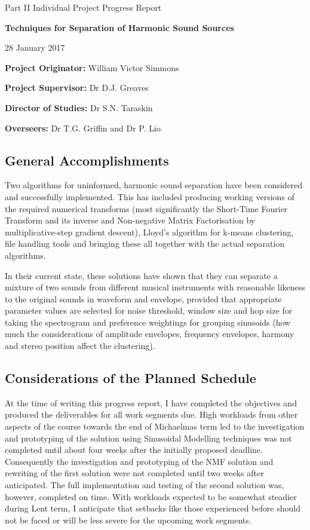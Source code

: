 \documentclass[12pt]{article}
\begin{document}
\medskip
{}
\medskip
{}

\vspace{5mm}

\centerline{\large Part II Individual Project Progress Report}
\vspace{5mm}
\centerline{\Large\bf Techniques for Separation of Harmonic Sound Sources}
\vspace{5mm}
\centerline{\large 28 January 2017}

{\bf Project Originator:} William Victor Simmons

{\bf Project Supervisor:} Dr D.J. Greaves

{\bf Director of Studies:} Dr S.N. Taraskin

{\bf Overseers:} Dr T.G. Griffin and Dr P. Lio

\subsection*{General Accomplishments}

Two algorithms for uninformed, harmonic sound separation have been considered and successfully implemented. This has included producing working versions of the required numerical transforms (most significantly the Short-Time Fourier Transform and its inverse and Non-negative Matrix Factorisation by multiplicative-step gradient descent), Lloyd's algorithm for k-means clustering, file handling tools and bringing these all together with the actual separation algorithms.

In their current state, these solutions have shown that they can separate a mixture of two sounds from different musical instruments with reasonable likeness to the original sounds in waveform and envelope, provided that appropriate parameter values are selected for noise threshold, window size and hop size for taking the spectrogram and preference weightings for grouping sinusoids (how much the considerations of amplitude envelopes, frequency envelopes, harmony and stereo position affect the clustering).

\subsection*{Considerations of the Planned Schedule}

At the time of writing this progress report, I have completed the objectives and produced the deliverables for all work segments due. High workloads from other aspects of the course towards the end of Michaelmas term led to the investigation and prototyping of the solution using Sinusoidal Modelling techniques was not completed until about four weeks after the initially proposed deadline. Consequently the investigation and prototyping of the NMF solution and rewriting of the first solution were not completed until two weeks after anticipated. The full implementation and testing of the second solution was, however, completed on time. With workloads expected to be somewhat steadier during Lent term, I anticipate that setbacks like those experienced before should not be faced or will be less severe for the upcoming work segments.
\end{document}
